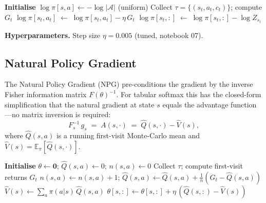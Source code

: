 \documentclass[11pt]{article}
\begin{document}
\begin{algorithm}[H]
\caption{Policy Mirror Descent}
\label{alg:md}
\begin{algorithmic}[1]
\State \textbf{Initialise} $\log\pi[s,a] \leftarrow -\log|\mathcal{A}|$ (uniform)
    \State Collect $\tau = \{(s_t,a_t,c_t)\}$;\; compute $G_t$
     
        \State $\log\pi[s_t,a_t] \;\leftarrow\; \log\pi[s_t,a_t] - \eta\,G_t$
        \State $\log\pi[s_t,:] \;\leftarrow\; \log\pi[s_t,:] - \log Z_{s_t}$
    \EndFor
\EndFor
\end{algorithmic}
\end{algorithm}

\textbf{Hyperparameters.}  Step size $\eta=0.005$ (tuned, notebook 07).

\subsection{Natural Policy Gradient}

The Natural Policy Gradient (NPG) pre-conditions the gradient by the inverse
Fisher information matrix $F(\theta)^{-1}$.  For tabular softmax this has the
closed-form simplification that the natural gradient at state $s$ equals the
advantage function—no matrix inversion is required:
\[
    F_s^{-1}\,g_s \;=\; A(s,\cdot) \;=\; \hat{Q}(s,\cdot) - \hat{V}(s),
\]
where $\hat{Q}(s,a)$ is a running first-visit Monte-Carlo mean and
$\hat{V}(s) = \mathbb{E}_{\pi}[\hat{Q}(s,\cdot)]$.

\begin{algorithm}[H]
\caption{Natural Policy Gradient (tabular)}
\label{alg:npg}
\begin{algorithmic}[1]
\State \textbf{Initialise} $\theta\leftarrow\mathbf{0}$;\;
       $\hat{Q}(s,a)\leftarrow 0$;\; $n(s,a)\leftarrow 0$
    \State Collect $\tau$;\; compute first-visit returns $G_t$
        \State $n(s,a)\leftarrow n(s,a)+1$;\;
               $\hat{Q}(s,a) \leftarrow \hat{Q}(s,a) + \tfrac{1}{n}(G_t - \hat{Q}(s,a))$
    \EndFor
        \State $\hat{V}(s) \leftarrow \sum_a \pi(a|s)\,\hat{Q}(s,a)$
        \State $\theta[s,:] \leftarrow \theta[s,:] + \eta\,(\hat{Q}(s,:) - \hat{V}(s))$
    \EndFor
\EndFor
\end{algorithmic}
\end{algorithm}
\end{document}
